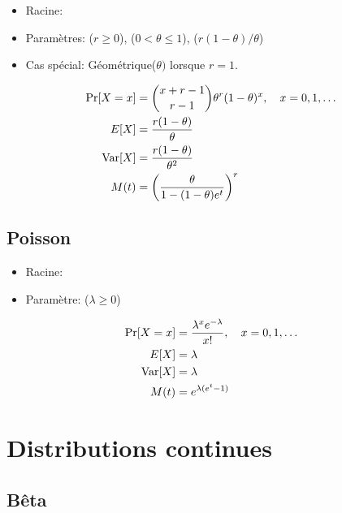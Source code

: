 \begin{itemize}
\item Racine: 
\item Paramètres:  ($r \geq 0$),
   ($0 < \theta \leq 1$),
   ($r(1 - \theta)/\theta$)
\end{itemize}
\begin{itemize}
\item Cas spécial: Géométrique($\theta)$ lorsque $r = 1$.
\end{itemize}
\begin{align*}
  \Pr[X = x]
  &= \binom{x + r - 1}{r - 1} \theta^r (1 - \theta)^x, \quad
  x = 0, 1, \dots \\
  E [ X ]
  &= \frac{r (1 - \theta)}{\theta} \\
  \operatorname{Var} [ X ]
  &= \frac{r (1 - \theta)}{\theta^2} \\
  M(t)
  &= \left( \frac{\theta}{1 - (1 - \theta)e^t} \right)^r
\end{align*}

\subsection{Poisson}
\label{distributions:poisson}

\begin{itemize}
\item Racine: 
\item Paramètre:  ($\lambda \geq 0$)
\end{itemize}
\begin{align*}
  \Pr[X = x]
  &= \frac{\lambda^x e^{-\lambda}}{x!}, \quad x = 0, 1, \dots \\
  E [ X ]
  &= \lambda \\
  \operatorname{Var} [ X ]
  &= \lambda \\
  M(t)
  &= e^{\lambda (e^t - 1)}
\end{align*}


\section{Distributions continues}

\subsection{Bêta}
\label{distributions:beta}

